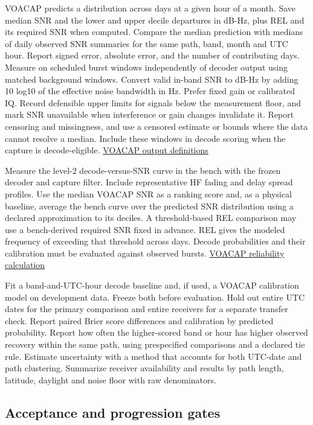 \documentclass[11pt,a4paper]{article}
\begin{document}
VOACAP predicts a distribution across days at a given hour of a month. Save median SNR and the lower and upper decile departures in dB-Hz, plus REL and its required SNR when computed. Compare the median prediction with medians of daily observed SNR summaries for the same path, band, month and UTC hour. Report signed error, absolute error, and the number of contributing days. Measure on scheduled burst windows independently of decoder output using matched background windows. Convert valid in-band SNR to dB-Hz by adding 10 log10 of the effective noise bandwidth in Hz. Prefer fixed gain or calibrated IQ. Record defensible upper limits for signals below the measurement floor, and mark SNR unavailable when interference or gain changes invalidate it. Report censoring and missingness, and use a censored estimate or bounds where the data cannot resolve a median. Include these windows in decode scoring when the capture is decode-eligible. \href{https://www.voacap.com/2023/voacap-windows-output.html}{VOACAP output definitions}

Measure the level-2 decode-versus-SNR curve in the bench with the frozen decoder and capture filter. Include representative HF fading and delay spread profiles. Use the median VOACAP SNR as a ranking score and, as a physical baseline, average the bench curve over the predicted SNR distribution using a declared approximation to its deciles. A threshold-based REL comparison may use a bench-derived required SNR fixed in advance. REL gives the modeled frequency of exceeding that threshold across days. Decode probabilities and their calibration must be evaluated against observed bursts. \href{https://www.voacap.com/2023/understanding/rel.html}{VOACAP reliability calculation}

Fit a band-and-UTC-hour decode baseline and, if used, a VOACAP calibration model on development data. Freeze both before evaluation. Hold out entire UTC dates for the primary comparison and entire receivers for a separate transfer check. Report paired Brier score differences and calibration by predicted probability. Report how often the higher-scored band or hour has higher observed recovery within the same path, using prespecified comparisons and a declared tie rule. Estimate uncertainty with a method that accounts for both UTC-date and path clustering. Summarize receiver availability and results by path length, latitude, daylight and noise floor with raw denominators.


\subsection{Acceptance and progression gates}
\label{md:9}
\end{document}
